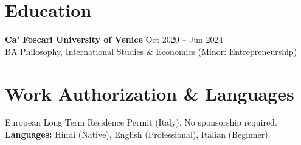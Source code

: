 \documentclass[a4paper,10pt]{article}
\begin{document}
\section{Education}
\textbf{Ca' Foscari University of Venice} \hfill Oct 2020 -- Jun 2024\\
BA Philosophy, International Studies \& Economics (Minor: Entrepreneurship)

\section{Work Authorization \& Languages}
European Long Term Residence Permit (Italy). No sponsorship required. \\
\textbf{Languages:} Hindi (Native), English (Professional), Italian (Beginner).
\end{document}
